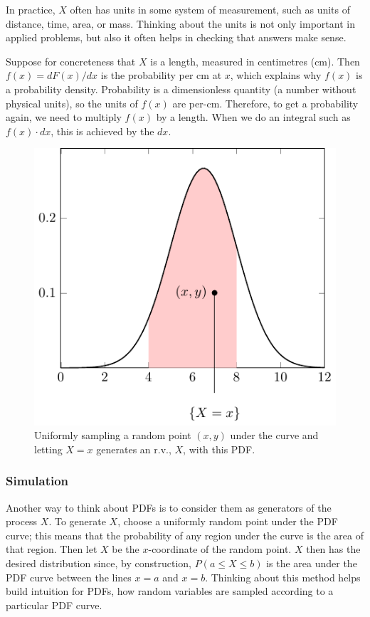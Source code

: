 In practice, 
\(X\) often has units in some system of measurement, 
such as units of distance, time, area, or mass. 
Thinking about the units is not only important in applied problems, 
but also it often helps in checking that answers make sense.

Suppose for concreteness that \(X\) is a length, 
measured in centimetres (cm). 
Then \(f(x) = dF(x)/dx\) is the probability per cm at \(x\), 
which explains why \(f(x)\) is a probability density. 
Probability is a dimensionless quantity (a number without physical units), 
so the units of \(f(x)\) are per-cm. 
Therefore, to get a probability again, 
we need to multiply \(f(x)\) by a length. 
When we do an integral such as \(f(x) \cdot dx\), 
this is achieved by the \(dx\).

\begin{figure}[h!]
\centering
\includegraphics[width=0.5\linewidth]{tikz/figure3.pdf}
\caption{%
Uniformly sampling a random point \((x,y)\) under the curve 
and letting \(X=x\) generates an r.v., \(X\), with this PDF.
}
\label{fig:generator}
\end{figure}

\subsubsection{Simulation} 

Another way to think about PDFs is to consider them as generators of the process \(X\). 
To generate \(X\), 
choose a uniformly random point under the PDF curve;
this means that the probability of any region under the curve is the area of that region. 
Then let \(X\) be the \(x\)-coordinate of the random point. 
\(X\) then has the desired distribution since, 
by construction, 
\(P(a \leq X \leq b)\) is the area under the PDF curve 
between the lines \(x = a\) and \(x = b\). 
Thinking about this method helps build intuition for PDFs, 
how random variables are sampled according to a particular PDF curve.

